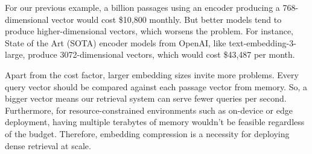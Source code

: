 \begin{table}[H]
  \centering
  \caption[Float32 index size and monthly instance cost by embedding dimension]{Float32
  embedding index size and estimated monthly cost on memory-optimized AWS x2gd instances
  (\$3.80/GB/month) at two corpus scales~\cite{shakir2024embedding, aws2024pricing}.
  Sizes are reported in GB (SI).}
  \label{tab:index-cost-intro}
\end{table}

For our previous example, a billion passages using an encoder producing a 768-dimensional vector would cost \$10,800 monthly. But better models tend to produce higher-dimensional vectors, which worsens the problem. For instance, State of the Art (SOTA) encoder models from OpenAI, like text-embedding-3-large, produce 3072-dimensional vectors, which would cost \$43,487 per month.

Apart from the cost factor, larger embedding sizes invite more problems. Every query vector should be compared against each passage vector from memory. So, a bigger vector means our retrieval system can serve fewer queries per second. Furthermore, for resource-constrained environments such as on-device or edge deployment, having multiple terabytes of memory wouldn't be feasible regardless of the budget. Therefore, embedding compression is a necessity for deploying dense retrieval at scale.

